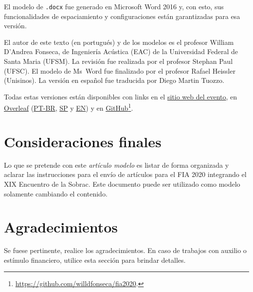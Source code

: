 \documentclass[12pt, a4paper, twoside, twocolumn]{article}
\begin{document}
El modelo de \texttt{.docx} fue generado en Microsoft Word 2016 y, con esto, sus funcionalidades de espaciamiento y configuraciones están garantizadas para esa versión.

El autor de este texto (en portugués) y de los modelos es el profesor William D'Andrea Fonseca, de Ingeniería Acústica (EAC) de la Universidad Federal de Santa Maria (UFSM).
%
La revisión fue realizada por el profesor {Stephan Paul} (UFSC).
El modelo de Ms~Word fue finalizado por el profesor Rafael Heissler (Unisinos).
%
La versión en español fue traducida por Diego Martin Tuozzo.

Todas estas versiones están disponibles con links en el \href{http://fia2020.com.br}{sitio web del evento}, en \href{https://www.overleaf.com/read/rszcxtwshzfr}{Overleaf} (\href{https://www.overleaf.com/read/rnfjxkknksnd}{PT-BR}, \href{https://www.overleaf.com/read/rszcxtwshzfr}{SP} y \href{https://www.overleaf.com/read/hgryywpgmxdx}{EN}) y en \href{https://github.com/willdfonseca/fia2020}{GitHub}\footnote{\url{https://github.com/willdfonseca/fia2020}.}.

\section{Consideraciones finales}

Lo que se pretende con este \textit{artículo modelo} es listar de forma organizada y aclarar las instrucciones para el envío de artículos para el FIA 2020 integrando el XIX Encuentro de la Sobrac. Este documento puede ser utilizado como modelo solamente cambiando el contenido.

\section{Agradecimientos}

Se fuese pertinente, realice los agradecimientos.
%
En caso de trabajos con auxilio o estímulo financiero, utilice esta sección para brindar detalles.
\end{document}
